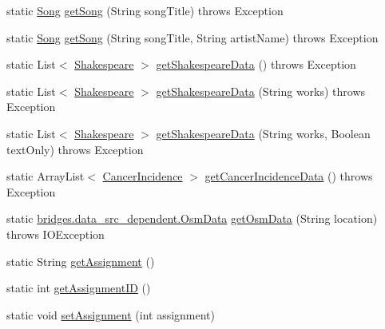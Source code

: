 \begin{DoxyCompactItemize}
\item 
static \mbox{\hyperlink{classbridges_1_1data__src__dependent_1_1_song}{Song}} \mbox{\hyperlink{classbridges_1_1connect_1_1_bridges_a7f65e6648f9e66a02343a39f2fc425cb}{get\+Song}} (String song\+Title)  throws Exception 
\item 
static \mbox{\hyperlink{classbridges_1_1data__src__dependent_1_1_song}{Song}} \mbox{\hyperlink{classbridges_1_1connect_1_1_bridges_ae7621c3cfd9978aa02fe243317cf0cca}{get\+Song}} (String song\+Title, String artist\+Name)  throws Exception 
\item 
static List$<$ \mbox{\hyperlink{classbridges_1_1data__src__dependent_1_1_shakespeare}{Shakespeare}} $>$ \mbox{\hyperlink{classbridges_1_1connect_1_1_bridges_adc8d19f28677afb03db53736455de2d0}{get\+Shakespeare\+Data}} ()  throws Exception 
\item 
static List$<$ \mbox{\hyperlink{classbridges_1_1data__src__dependent_1_1_shakespeare}{Shakespeare}} $>$ \mbox{\hyperlink{classbridges_1_1connect_1_1_bridges_a53ac587893826c57644f2e03b33ae455}{get\+Shakespeare\+Data}} (String works)  throws Exception 
\item 
static List$<$ \mbox{\hyperlink{classbridges_1_1data__src__dependent_1_1_shakespeare}{Shakespeare}} $>$ \mbox{\hyperlink{classbridges_1_1connect_1_1_bridges_aa81c312e631bc76fa49e0ccae66679dc}{get\+Shakespeare\+Data}} (String works, Boolean text\+Only)  throws Exception 
\item 
static Array\+List$<$ \mbox{\hyperlink{classbridges_1_1data__src__dependent_1_1_cancer_incidence}{Cancer\+Incidence}} $>$ \mbox{\hyperlink{classbridges_1_1connect_1_1_bridges_ad3d3afcf9df9e2b87d069bc050029628}{get\+Cancer\+Incidence\+Data}} ()  throws Exception 
\item 
static \mbox{\hyperlink{classbridges_1_1data__src__dependent_1_1_osm_data}{bridges.\+data\+\_\+src\+\_\+dependent.\+Osm\+Data}} \mbox{\hyperlink{classbridges_1_1connect_1_1_bridges_a25bb61cd96bd844c01a1658a02a295b3}{get\+Osm\+Data}} (String location)  throws I\+O\+Exception 
\item 
static String \mbox{\hyperlink{classbridges_1_1connect_1_1_bridges_af049c06c532987eb616156fb16ea2f43}{get\+Assignment}} ()
\item 
static int \mbox{\hyperlink{classbridges_1_1connect_1_1_bridges_ac13ed456687540b57c138adb11735d95}{get\+Assignment\+ID}} ()
\item 
static void \mbox{\hyperlink{classbridges_1_1connect_1_1_bridges_ad56c9d138965c41947bb51fe056c1cc9}{set\+Assignment}} (int assignment)

\end{DoxyCompactItemize}
